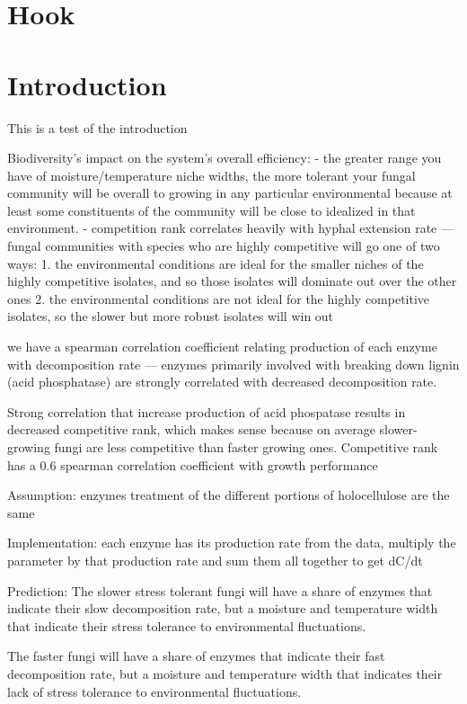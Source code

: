 \documentclass[12pt]{article}
\begin{document}
\begin{multicols}{2}
\section{Hook}
\lipsum[1]

\section{Introduction}
This is a test of the introduction \cite{Gow1995}

Biodiversity's impact on the system's overall efficiency:
- the greater range you have of moisture/temperature niche widths, the more tolerant your fungal community will be overall to growing in any particular environmental because at least some constituents of the community will be close to idealized in that environment.
- competition rank correlates heavily with hyphal extension rate — fungal communities with species who are highly competitive will go one of two ways: 1. the environmental conditions are ideal for the smaller niches of the highly competitive isolates, and so those isolates will dominate out over the other ones 2. the environmental conditions are not ideal for the highly competitive isolates, so the slower but more robust isolates will win out

we have a spearman correlation coefficient relating production of each enzyme with decomposition rate — enzymes primarily involved with breaking down lignin (acid phosphatase) are strongly correlated with decreased decomposition rate.

Strong correlation that increase production of acid phospatase results in decreased competitive rank, which makes sense because on average slower-growing fungi are less competitive than faster growing ones. Competitive rank has a 0.6 spearman correlation coefficient with growth performance

Assumption: enzymes treatment of the different portions of holocellulose are the same 

Implementation: each enzyme has its production rate from the data, multiply the parameter by that production rate and sum them all together to get dC/dt


Prediction:
The slower stress tolerant fungi will have a share of enzymes that indicate their slow decomposition rate, but a moisture and temperature width that indicate their stress tolerance to environmental fluctuations. 

The faster fungi will have a share of enzymes that indicate their fast decomposition rate, but a moisture and temperature width that indicates their lack of stress tolerance to environmental fluctuations.


\end{multicols}
\end{document}
